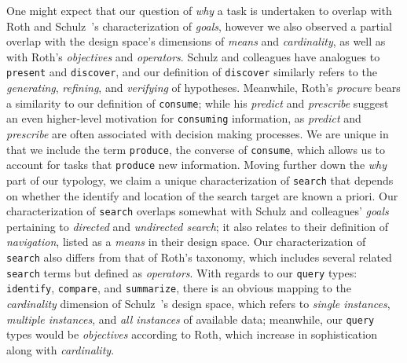 One might expect that our question of {\it why} a task is undertaken to overlap with Roth and Schulz~\etal's characterization of {\it goals}, however we also observed a partial overlap with the design space's dimensions of {\it means} and {\it cardinality}, as well as with Roth's {\it objectives} and {\it operators}.
Schulz and colleagues have analogues to {\tt present} and {\tt discover}, and our definition of {\tt discover} similarly refers to the {\it generating}, {\it refining}, and {\it verifying} of hypotheses.
Meanwhile, Roth's {\it procure} bears a similarity to our definition of {\tt consume}; while his {\it predict} and {\it prescribe} suggest an even higher-level motivation for {\tt consuming} information, as {\it predict} and {\it prescribe} are often associated with decision making processes.
We are unique in that we include the term {\tt produce}, the converse of {\tt consume}, which allows us to account for tasks that {\tt produce} new information.
Moving further down the {\it why} part of our typology, we claim a unique characterization of {\tt search} that depends on whether the identify and location of the search target are known a priori. 
Our characterization of {\tt search} overlaps somewhat with Schulz and colleagues' {\it goals} pertaining to {\it directed} and {\it undirected search}; it also relates to their definition of {\it navigation}, listed as a {\it means} in their design space. 
Our characterization of {\tt search} also differs from that of Roth's taxonomy, which includes several related {\tt search} terms but defined as {\it operators}. 
With regards to our {\tt query} types: {\tt identify}, {\tt compare}, and {\tt summarize}, there is an obvious mapping to the {\it cardinality} dimension of Schulz~\etal's design space, which refers to {\it single instances}, {\it multiple instances}, and {\it all instances} of available data; meanwhile, our {\tt query} types would be {\it objectives} according to Roth, which increase in sophistication along with {\it cardinality}.

